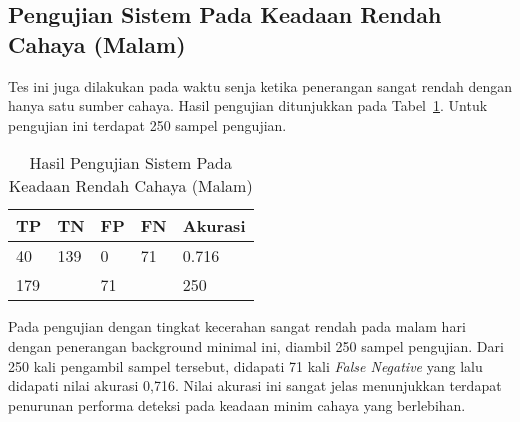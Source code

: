 \subsection{Pengujian Sistem Pada Keadaan Rendah Cahaya (Malam)}
\label{subsec:systest_test_lowilu_malam}

\par Tes ini juga dilakukan pada waktu senja ketika penerangan sangat rendah dengan hanya satu sumber cahaya. Hasil pengujian ditunjukkan pada Tabel~\ref{tb:systest_lowillum_dark}. Untuk pengujian ini terdapat 250 sampel pengujian.

\begin{table}
    \centering
    \caption{Hasil Pengujian Sistem Pada Keadaan Rendah Cahaya (Malam)}
    \label{tb:systest_lowillum_dark}
    \begin{tabular}{|l|l|l|l|l|} 
      \hline
      TP & TN                     & FP & FN                 & Akurasi  \\ 
      \hline
      40 & 139                    & 0  & 71                 & 0.716     \\ 
      \hline
      \multicolumn{2}{|l|}{179}   & \multicolumn{2}{l|}{71} &  250      \\
      \hline
    \end{tabular}
\end{table}

\par Pada pengujian dengan tingkat kecerahan sangat rendah pada malam hari dengan penerangan background minimal ini, diambil 250 sampel pengujian. Dari 250 kali pengambil sampel tersebut, didapati 71 kali \emph{False Negative} yang lalu didapati nilai akurasi 0,716. Nilai akurasi ini sangat jelas menunjukkan terdapat penurunan performa deteksi pada keadaan minim cahaya yang berlebihan.

